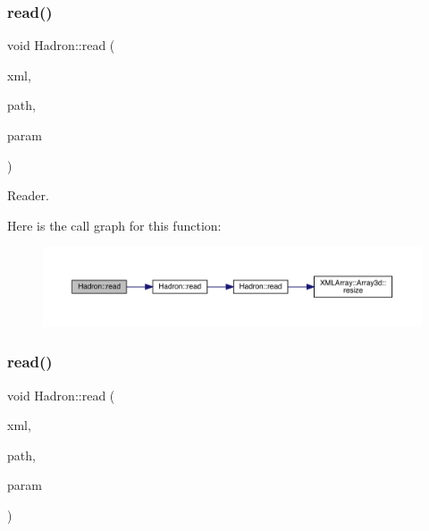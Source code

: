 \subsubsection{\texorpdfstring{read()}{read()}\hspace{0.1cm}{\footnotesize\ttfamily [15/94]}}
{\footnotesize\ttfamily void Hadron\+::read (\begin{DoxyParamCaption}\item[{\mbox{\hyperlink{classADATXML_1_1XMLReader}{X\+M\+L\+Reader}} \&}]{xml,  }\item[{const std\+::string \&}]{path,  }\item[{\mbox{\hyperlink{structHadron_1_1ValTimeSlice__t}{Val\+Time\+Slice\+\_\+t}} \&}]{param }\end{DoxyParamCaption})}



Reader. 

Here is the call graph for this function\+:\nopagebreak
\begin{figure}[H]
\begin{center}
\leavevmode
\includegraphics[width=350pt]{d1/daf/namespaceHadron_aa4df93329eeddeec176cd9df5abe9ce1_cgraph}
\end{center}
\end{figure}
\mbox{\label{namespaceHadron_a921e2dea91400934dabd596c18164033}} 
\subsubsection{\texorpdfstring{read()}{read()}\hspace{0.1cm}{\footnotesize\ttfamily [16/94]}}
{\footnotesize\ttfamily void Hadron\+::read (\begin{DoxyParamCaption}\item[{\mbox{\hyperlink{classADATXML_1_1XMLReader}{X\+M\+L\+Reader}} \&}]{xml,  }\item[{const std\+::string \&}]{path,  }\item[{\mbox{\hyperlink{structHadron_1_1KeyHadronSUNNPartNPtCorr__t}{Key\+Hadron\+S\+U\+N\+N\+Part\+N\+Pt\+Corr\+\_\+t}} \&}]{param }\end{DoxyParamCaption})}



